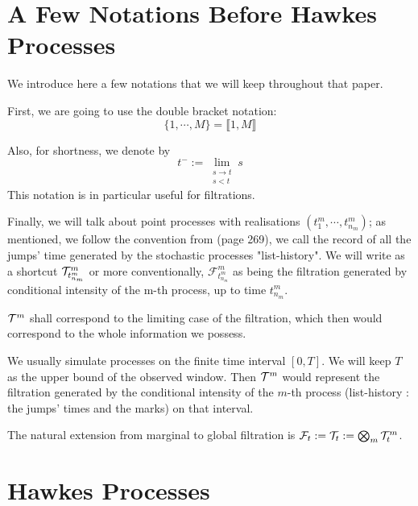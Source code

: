 \documentclass[11pt]{book}
\begin{document}
\section{A Few Notations Before Hawkes Processes}
We introduce here a few notations that we will keep throughout that paper.

First, we are going to use the double bracket notation: 
$$ \{1, \cdots, M\} = \llbracket 1, M \rrbracket $$

Also, for shortness, we denote by $$t^- := \lim_{ \substack{ s \to t \\ s < t}  } s $$ This notation is in particular useful for filtrations.

Finally, we will talk about point processes with realisations $ ( t_{1}^m, \cdots , t_{n_m}^m ) $; as mentioned, we follow the convention from \cite{daley} (page 269), we call the record of all the jumps' time generated by the stochastic processes "list-history".  We will write as a shortcut  $ \mathcal{T}^m_{t_{n_m}^m } $ or more conventionally, $\mathcal F^m_{t_{n_m}^m }$ as being the filtration generated by conditional intensity of the m-th process, up to time $t_{n_m}^m$.

$ \mathcal{T}^m$ shall correspond to the limiting case of the filtration, which then would correspond to the whole information we possess. 

We usually simulate processes on the finite time interval $[0,T]$. We will keep $T$ as the upper bound of the observed window. Then $ \mathcal{T}^m$ would represent the filtration generated by the conditional intensity of the $m$-th process (list-history : the jumps' times and the marks) on that interval.

The natural extension from marginal to global filtration is $\mathcal F_t := \mathcal{T}_t := \bigotimes_m \mathcal{T}^m_t $.

\section{Hawkes Processes}
\end{document}
